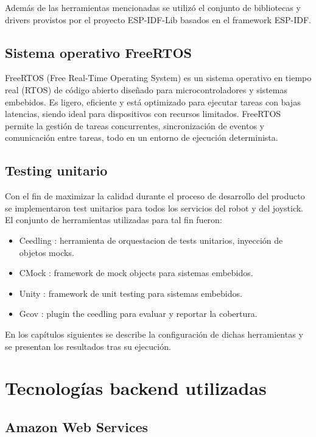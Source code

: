 Además de las herramientas mencionadas se utilizó el conjunto de bibliotecas y drivers provistos por el proyecto ESP-IDF-Lib \cite{esp_idf_lib_website} basados en el framework ESP-IDF.



\subsection{Sistema operativo FreeRTOS}

FreeRTOS (Free Real-Time Operating System) \citep{FreeRTOS} es un sistema operativo en tiempo real (RTOS) de código abierto diseñado para microcontroladores y sistemas embebidos. Es ligero, eficiente y está optimizado para ejecutar tareas con bajas latencias, siendo ideal para dispositivos con recursos limitados. FreeRTOS permite la gestión de tareas concurrentes, sincronización de eventos y comunicación entre tareas, todo en un entorno de ejecución determinista.

\subsection{Testing unitario}
Con el fin de maximizar la calidad durante el proceso de desarrollo del producto se implementaron test unitarios para todos los servicios del robot y del joystick. El conjunto de herramientas utilizadas para tal fin fueron:
\begin{itemize}
	\item Ceedling \cite{SoftwareTool_Ceedling}: herramienta de orquestacion de tests unitarios, inyección de objetos mocks.
	\item CMock \cite{SoftwareTool_CMock}: framework de mock objects para sistemas embebidos.
	\item Unity \cite{SoftwareTool_Unity}: framework de unit testing para sistemas embebidos.
	\item Gcov \cite{SoftwareTool_CeedlingGCov}: plugin the ceedling para evaluar y reportar la cobertura.
\end{itemize}

En los capítulos siguientes se describe la configuración de dichas herramientas y se presentan los resultados tras su ejecución.


\section{Tecnologías backend utilizadas}


\subsection{Amazon Web Services}

